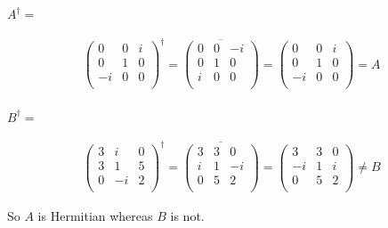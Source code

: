 \documentclass{article}
\numberwithin{equation}{subsection} %
\theoremstyle{definition}
\begin{document}
\paragraph{$A^\dagger=$}
\begin{align*}
    \left( \begin{array}{ccc}
     0 & 0 & i \\
     0 & 1 & 0 \\
     -i & 0 & 0 \\
    \end{array} \right)^\dagger = 
    \overline{\left( \begin{array}{ccc}
     0 & 0 & -i \\
     0 & 1 & 0 \\
     i & 0 & 0 \\
    \end{array} \right)} = 
    \left( \begin{array}{ccc}
     0 & 0 & i \\
     0 & 1 & 0 \\
     -i & 0 & 0 \\
    \end{array} \right) = A
\end{align*}
\paragraph{$B^\dagger=$}
\begin{align*}
    \left( \begin{array}{ccc}
     3 & i & 0 \\
     3 & 1 & 5 \\
     0 & -i & 2 \\
    \end{array} \right)^\dagger = 
    \overline{\left( \begin{array}{ccc}
     3 & 3 & 0 \\
     i & 1 & -i \\
     0 & 5 & 2 \\
    \end{array} \right)} = 
    \left( \begin{array}{ccc}
     3 & 3 & 0 \\
     -i & 1 & i \\
     0 & 5 & 2 \\
    \end{array} \right) \neq B
\end{align*}

So $A$ is Hermitian whereas $B$ is not.
\end{document}
